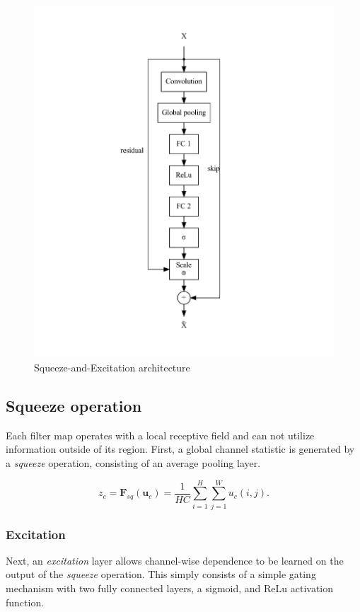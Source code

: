 \documentclass[6pt,oneside]{article}
\newcommand{\vect}[1]{\boldsymbol{#1}}
\begin{document}
\begin{figure}[h]
    \center
    \caption{Squeeze-and-Excitation architecture}
    \includegraphics[scale=0.6]{se}
\end{figure}

\subsection{Squeeze operation}

Each filter map operates with a local receptive field and can not utilize information outside of its region.
First, a global channel statistic is generated by a \emph{squeeze} operation, consisting of an average 
pooling layer.

$$
z_c = \vect{F}_{sq}(\vect{u}_c) = \frac{1}{HC}\sum_{i=1}^H\sum_{j=1}^W u_c(i, j).
$$

\subsubsection{Excitation}

Next, an \emph{excitation} layer allows channel-wise dependence to be learned on the output of the
\emph{squeeze} operation. This simply consists of a simple gating mechanism with two fully connected
layers, a sigmoid, and ReLu activation function.
\end{document}
